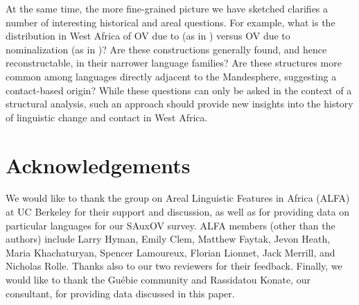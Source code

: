 \documentclass[output=paper,newtxmath,modfonts,nonflat,draftmode]{langsci/langscibook}
\begin{document}
At the same time, the more fine-grained picture we have sketched clarifies a number of interesting historical and areal questions. For example, what is the distribution in West Africa of OV due to  (as in ) versus OV due to nominalization (as in )? Are these constructions generally found, and hence reconstructable, in their narrower language families? Are these structures more common among languages directly adjacent to the Mandesphere, suggesting a contact-based origin? While these questions can only be asked in the context of a structural analysis, such an approach should provide new insights into the history of linguistic change and contact in West Africa.


\section*{Acknowledgements}
We would like to thank the group on Areal Linguistic Features in Africa (ALFA) at UC Berkeley for their support and discussion, as well as for providing data on particular languages for our SAuxOV survey. ALFA members (other than the authors) include Larry Hyman, Emily Clem, Matthew Faytak, Jevon Heath, Maria Khachaturyan, Spencer Lamoureux, Florian Lionnet, Jack Merrill, and Nicholas Rolle. Thanks also to our two reviewers for their feedback. Finally, we would like to thank the Guébie community and Rassidatou Konate, our  consultant, for providing data discussed in this paper.
\end{document}
